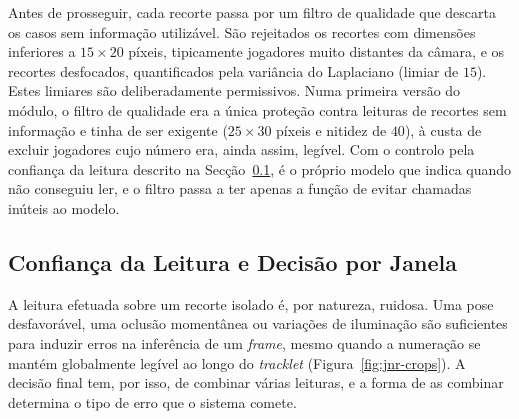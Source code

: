 


Antes de prosseguir, cada recorte passa por um filtro de qualidade que descarta os casos sem
informação utilizável. São rejeitados os recortes com dimensões inferiores a $15\times20$ píxeis,
tipicamente jogadores muito distantes da câmara, e os recortes desfocados, quantificados pela
variância do Laplaciano (limiar de $15$). Estes limiares são deliberadamente permissivos. Numa
primeira versão do módulo, o filtro de qualidade era a única proteção contra leituras de recortes
sem informação e tinha de ser exigente ($25\times30$ píxeis e nitidez de $40$), à custa de excluir
jogadores cujo número era, ainda assim, legível. Com o controlo pela confiança da leitura descrito
na Secção~\ref{sec:met-jnr-confianca}, é o próprio modelo que indica quando não conseguiu ler, e o
filtro passa a ter apenas a função de evitar chamadas inúteis ao modelo.



\subsection{Confiança da Leitura e Decisão por Janela}\label{sec:met-jnr-confianca}

A leitura efetuada sobre um recorte isolado é, por natureza, ruidosa. Uma pose desfavorável, uma
oclusão momentânea ou variações de iluminação são suficientes para induzir erros na inferência de
um \emph{frame}, mesmo quando a numeração se mantém globalmente legível ao longo do
\emph{tracklet} (Figura~\ref{fig:jnr-crops}). A decisão final tem, por isso, de combinar várias
leituras, e a forma de as combinar determina o tipo de erro que o sistema comete.

